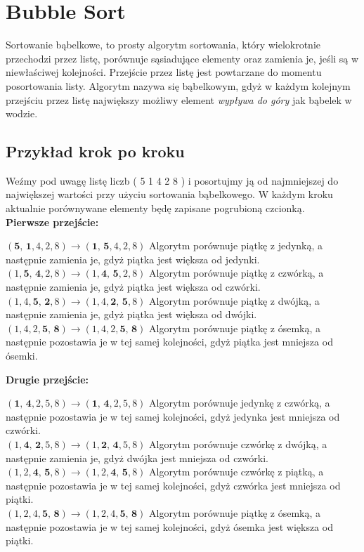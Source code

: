 \documentclass[knowledge.tex]{subfiles}
\begin{document}
    \section{Bubble Sort}
    Sortowanie bąbelkowe, to prosty algorytm sortowania, który wielokrotnie przechodzi przez listę, porównuje sąsiadujące elementy oraz zamienia je, jeśli są w niewłaściwej kolejności. Przejście przez listę jest powtarzane do momentu posortowania listy. Algorytm nazywa się bąbelkowym, gdyż w każdym kolejnym przejściu przez listę największy możliwy element \textit{wypływa do góry} jak bąbelek w wodzie.
    
    \subsection*{Przykład krok po kroku}
    Weźmy pod uwagę listę liczb ( 5 1 4 2 8 ) i posortujmy ją od najmniejszej do największej wartości przy użyciu sortowania bąbelkowego. W każdym kroku aktualnie porównywane elementy będę zapisane pogrubioną czcionką.\\[0.3cm]
    \textbf{Pierwsze przejście:}
    \begin{addmargin}[2em]{0em}
        $( \textbf{5, 1}, 4, 2, 8 ) \rightarrow ( \textbf{1, 5}, 4, 2, 8 )$ Algorytm porównuje piątkę z jedynką, a następnie zamienia je, gdyż piątka jest większa od jedynki.\\[0.1cm]
        $( 1, \textbf{5, 4}, 2, 8 ) \rightarrow ( 1, \textbf{4, 5}, 2, 8 )$ Algorytm porównuje piątkę z czwórką, a następnie zamienia je, gdyż piątka jest większa od czwórki.\\[0.1cm]
        $( 1, 4, \textbf{5, 2}, 8 ) \rightarrow ( 1, 4, \textbf{2, 5}, 8 )$ Algorytm porównuje piątkę z dwójką, a następnie zamienia je, gdyż piątka jest większa od dwójki.\\[0.1cm]
        $( 1, 4, 2, \textbf{5, 8} ) \rightarrow ( 1, 4, 2, \textbf{5, 8} )$ Algorytm porównuje piątkę z ósemką, a następnie pozostawia je w tej samej kolejności, gdyż piątka jest mniejsza od ósemki.\\[0.1cm]
    \end{addmargin}
    \textbf{Drugie przejście:}
    \begin{addmargin}[2em]{0em}
        $( \textbf{1, 4}, 2, 5, 8 ) \rightarrow ( \textbf{1, 4}, 2, 5, 8 )$ Algorytm porównuje jedynkę z czwórką, a następnie pozostawia je w tej samej kolejności, gdyż jedynka jest mniejsza od czwórki.\\[0.1cm]
        $( 1, \textbf{4, 2}, 5, 8 ) \rightarrow ( 1, \textbf{2, 4}, 5, 8 )$ Algorytm porównuje czwórkę z dwójką, a następnie zamienia je, gdyż dwójka jest mniejsza od czwórki.\\[0.1cm]
        $( 1, 2, \textbf{4, 5}, 8 ) \rightarrow ( 1, 2, \textbf{4, 5}, 8 )$ Algorytm porównuje czwórkę z piątką, a następnie pozostawia je w tej samej kolejności, gdyż czwórka jest mniejsza od piątki.\\[0.1cm]
        $( 1, 2, 4, \textbf{5, 8} ) \rightarrow ( 1, 2, 4, \textbf{5, 8} )$ Algorytm porównuje piątkę z ósemką, a następnie pozostawia je w tej samej kolejności, gdyż ósemka jest większa od piątki.\\[0.1cm]
    \end{addmargin}
\end{document}
